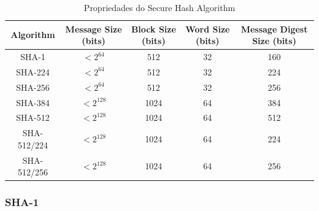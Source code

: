 \documentclass[conference]{IEEEtran}
\begin{document}
\begin{table}[ht]
\centering
\begin{adjustbox}{width=0.5\textwidth}
\small
\begin{tabular}{|c|c|c|c|c|}
    \hline
    Algorithm & Message Size (bits) & Block Size (bits) & Word Size (bits) & Message Digest Size (bits) \\
    \hline
    SHA-1 & $< 2^{64}$ & 512 & 32 & 160 \\
    \hline
    SHA-224 & $< 2^{64}$ & 512 & 32 & 224 \\
    \hline
    SHA-256 & $< 2^{64}$ & 512 & 32 & 256 \\
    \hline
    SHA-384 & $< 2^{128}$ & 1024 & 64 & 384 \\
    \hline
    SHA-512 & $< 2^{128}$ & 1024 & 64 & 512 \\
    \hline
    SHA-512/224 & $< 2^{128}$ & 1024 & 64 & 224 \\
    \hline
    SHA-512/256 & $< 2^{128}$ & 1024 & 64 & 256 \\
    \hline
\end{tabular}
\end{adjustbox}
\vspace{1em}
\caption{Propriedades do Secure Hash Algorithm}
\label{shatable}
\end{table}
\cite{SHS2015}

\subsubsection{SHA-1}
\end{document}
